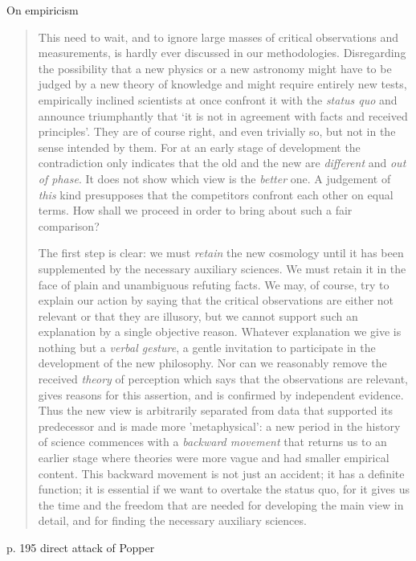 On empiricism
\begin{quotation}
This need to wait, and to ignore large masses of critical
observations and measurements, is hardly ever discussed in our
methodologies. Disregarding the possibility that a new physics or a
new astronomy might have to be judged by a new theory of knowledge
and might require entirely new tests, empirically inclined scientists at
once confront it with the \textit{status quo} and announce triumphantly that `it
is not in agreement with facts and received principles'. They are of
course right, and even trivially so, but not in the sense intended by
them. For at an early stage of development the contradiction only
indicates that the old and the new are \textit{different} and \textit{out of phase}. It does
not show which view is the \textit{better} one. A judgement of \textit{this} kind
presupposes that the competitors confront each other on equal
terms. How shall we proceed in order to bring about such a fair
comparison?


The first step is clear: we must \textit{retain} the new cosmology until it has
been supplemented by the necessary auxiliary sciences. We must
retain it in the face of plain and unambiguous refuting facts. We may,
of course, try to explain our action by saying that the critical
observations are either not relevant or that they are illusory, but we
cannot support such an explanation by a single objective reason.
Whatever explanation we give is nothing but a \textit{verbal gesture}, a gentle
invitation to participate in the development of the new philosophy.
Nor can we reasonably remove the received \textit{theory} of perception
which says that the observations are relevant, gives reasons for this
assertion, and is confirmed by independent evidence. Thus the new
view is arbitrarily separated from data that supported its predecessor
and is made more 'metaphysical': a new period in the history of
science commences with a \textit{backward movement} that returns us to an
earlier stage where theories were more vague and had smaller
empirical content. This backward movement is not just an accident;
it has a definite function; it is essential if we want to overtake the status
quo, for it gives us the time and the freedom that are needed for
developing the main view in detail, and for finding the necessary
auxiliary sciences.
\citep[113-114]{feyerabend1993against}

\end{quotation}

p. 195 direct attack of Popper

